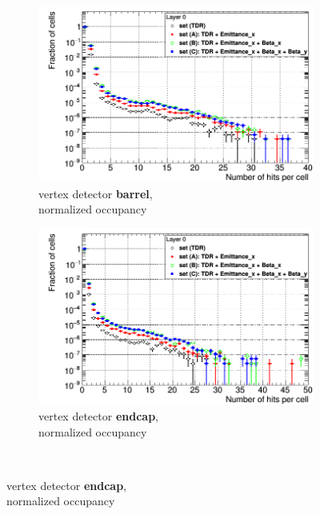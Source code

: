  \begin{figure}
  \captionsetup[subfigure]{justification=centering}
 \centering
  \begin{subfigure}[b]{0.49\textwidth}
   \centering
    \includegraphics[width=\textwidth]{Figures/Pairs/Occupancy_Comparison_Layer_0_numcells_ILC250_ALL_SETS_SiVertexBarrel_corrected_Barrel_size.png}
   \caption{\sid vertex detector \textbf{barrel},\\normalized occupancy}
   \end{subfigure}
   \hfill
     \begin{subfigure}[b]{0.49\textwidth}
   \centering
    \includegraphics[width=\textwidth]{Figures/Pairs/Occupancy_Comparison_Layer_0_numcells_ILC250_ALL_SETS_5T_w_antiDiD_SiVertexEndcap.png}
   \caption{\sid vertex detector \textbf{endcap},\\normalized occupancy}
   \end{subfigure}\\

\end{figure}
